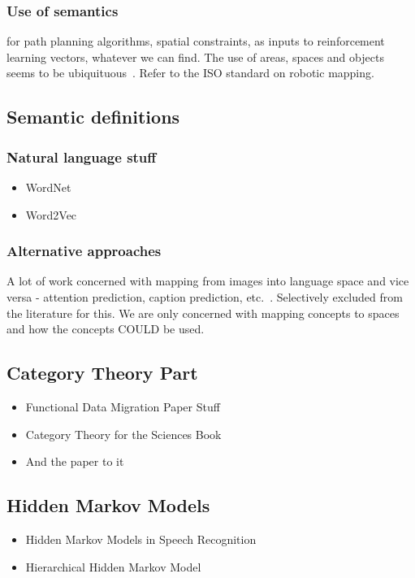 \documentclass[a4paper,12pt]{article}
\theoremstyle{mytheor}
\begin{document}
\subsubsection{Use of semantics}
for path planning algorithms, spatial constraints, as inputs to reinforcement learning vectors, whatever we can find. The use of areas, spaces and objects seems to be ubiquituous~\cite{galindo_robot_2008,anderson_evaluation_2018,kostavelis_semantic_2015,kuipers_spatial_2000}. Refer to the ISO standard on robotic mapping.
\subsection{Semantic definitions}
\subsubsection{Natural language stuff}
\begin{itemize}
    \item WordNet~\cite{fellbaum_nouns_1998,budanitsky_evaluating_2006}
    \item Word2Vec~\cite{bojanowski_enriching_2016}
\end{itemize}
\subsubsection{Alternative approaches}
A lot of work concerned with mapping from images into language space and vice versa - attention prediction, caption prediction, etc.~\cite{barnard_computational_2016}. Selectively excluded from the literature for this. We are only concerned with mapping concepts to spaces and how the concepts COULD be used.
\subsection{Category Theory Part}
\begin{itemize}
    \item Functional Data Migration Paper Stuff~\cite{spivak_functorial_2013}
    \item Category Theory for the Sciences Book~\cite{david_i_spivak_category_2014}
    \item And the paper to it~\cite{spivak_ologs_2012}
\end{itemize}
\subsection{Hidden Markov Models}
\begin{itemize}
    \item Hidden Markov Models in Speech Recognition\cite{rabiner_tutorial_1989}
    \item Hierarchical Hidden Markov Model~\cite{fine_hierarchical_1998}
\end{itemize}



\end{document}
